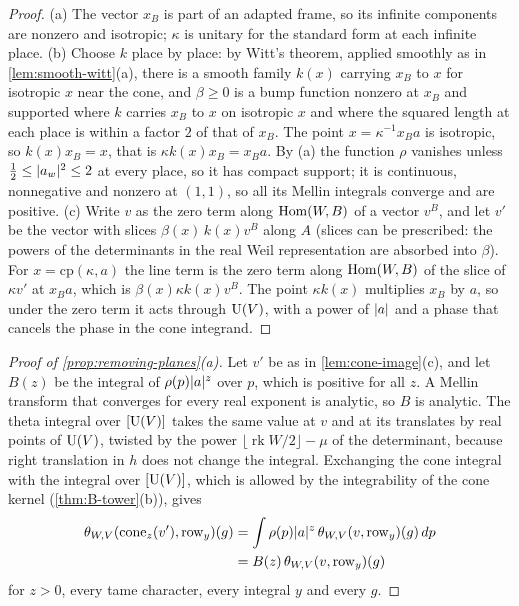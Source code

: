 \begin{proof}
(a) The vector $x_B$ is part of an adapted frame, so its infinite components are nonzero and isotropic; $\kappa$ is unitary for the standard form at each infinite place. (b) Choose $k$ place by place: by Witt's
theorem, applied smoothly as in \cref{lem:smooth-witt}(a), there is a smooth family $k(x)$ carrying $x_B$ to $x$ for isotropic $x$ near the cone, and $\beta\ge0$ is a bump function nonzero at $x_B$ and supported where
$k$ carries $x_B$ to $x$ on isotropic $x$ and where the squared length at each place is within a factor $2$ of that of $x_B$. The point $x=\kappa^{-1}x_Ba$ is isotropic, so $k(x)x_B=x$, that is $\kappa k(x)x_B=x_Ba$.
By (a) the function $\rho$ vanishes unless $\frac12\le\lvert a_w\rvert^2\le2$ at every place, so it has compact support; it is continuous, nonnegative and nonzero at $(1,1)$, so all its Mellin integrals converge and are
positive. (c) Write $v$ as the zero term along $\operatorname{Hom}(W,B)$ of a vector $v^B$, and let $v'$ be the vector with slices $\beta(x)\,k(x)v^B$ along $A$ (slices can be prescribed: the powers of the determinants in the real
Weil representation are absorbed into $\beta$). For $x=\mathrm{cp}(\kappa,a)$ the line term is the zero term along $\operatorname{Hom}(W,B)$ of the slice of $\kappa v'$ at $x_Ba$, which is $\beta(x)\kappa k(x)v^B$. The point
$\kappa k(x)$ multiplies $x_B$ by $a$, so under the zero term it acts through $\operatorname{U}(V)$, with a power of $\lvert a\rvert$ and a phase that cancels the phase in the cone integrand.
\end{proof}

\begin{proof}[Proof of \cref{prop:removing-planes}(a)]
Let $v'$ be as in \cref{lem:cone-image}(c), and let $B(z)$ be the integral of $\rho(p)\lvert a\rvert^z$ over $p$, which is positive for all $z$. A Mellin transform that converges for every real exponent is analytic, so $B$ is analytic. The theta integral
over $[\operatorname{U}(V)]$ takes the same value at $v$ and at its translates by real points of $\operatorname{U}(V)$, twisted by the power $\lfloor\operatorname{rk}W/2\rfloor-\mu$ of the determinant, because right translation in $h$ does not
change the integral. Exchanging the cone integral with the integral over $[\operatorname{U}(V)]$, which is allowed by the integrability of the cone kernel (\cref{thm:B-tower}(b)), gives
\begin{align*}
  \theta_{W,V}(\mathrm{cone}_z(v'),\mathrm{row}_y)(g)&=\int\rho(p)\lvert a\rvert^z\,\theta_{W,V}(v,\mathrm{row}_y)(g)\,dp\\
  &=B(z)\,\theta_{W,V}(v,\mathrm{row}_y)(g)
\end{align*}
for $z>0$, every tame character, every integral $y$ and every $g$.
\end{proof}

